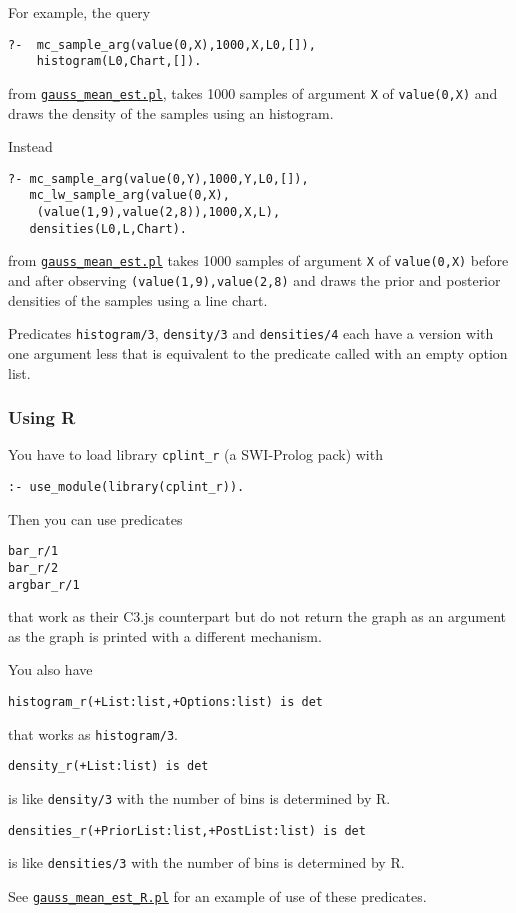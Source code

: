 For example, the query
\begin{verbatim}
?-  mc_sample_arg(value(0,X),1000,X,L0,[]),
    histogram(L0,Chart,[]).
\end{verbatim}
from \href{http://cplint.eu/example/inference/gauss_mean_est.pl}{\texttt{gauss\_mean\_est.pl}},
takes 1000 samples of argument \verb|X| of \verb|value(0,X)| and draws the density of the samples using an histogram.

Instead
\begin{verbatim}
?- mc_sample_arg(value(0,Y),1000,Y,L0,[]),
   mc_lw_sample_arg(value(0,X),
    (value(1,9),value(2,8)),1000,X,L),
   densities(L0,L,Chart).
\end{verbatim}
from \href{http://cplint.eu/example/inference/gauss_mean_est.pl}{\texttt{gauss\_mean\_est.pl}}
takes 1000 samples of argument \verb|X| of \verb|value(0,X)| before and after observing
\verb|(value(1,9),value(2,8)| and draws the prior and posterior densities of the samples using a line chart.

Predicates \verb|histogram/3|,  \verb|density/3|  and  \verb|densities/4| each have a version with one 
argument less that is equivalent to the predicate called with an empty option list.

\subsubsection{Using R}
You have to load library \texttt{cplint\_r}  (a SWI-Prolog pack) with
\begin{verbatim}
:- use_module(library(cplint_r)).
\end{verbatim}
Then you can use predicates
\begin{verbatim}
bar_r/1
bar_r/2
argbar_r/1
\end{verbatim}
that work as their C3.js counterpart but do not return the graph as an argument as the graph is
printed with a different mechanism.

You also have
\begin{verbatim}
histogram_r(+List:list,+Options:list) is det
\end{verbatim}
that works as \texttt{histogram/3}.
\begin{verbatim}
density_r(+List:list) is det
\end{verbatim}
is like \texttt{density/3} with the number of bins  is determined
by R.
\begin{verbatim}
densities_r(+PriorList:list,+PostList:list) is det
\end{verbatim}
is like \texttt{densities/3} with the number of bins  is determined
by R.

See \href{http://cplint.eu/example/inference/gauss_mean_est_R.pl}{\texttt{gauss\_mean\_est\_R.pl}} for an example of use of these predicates.


